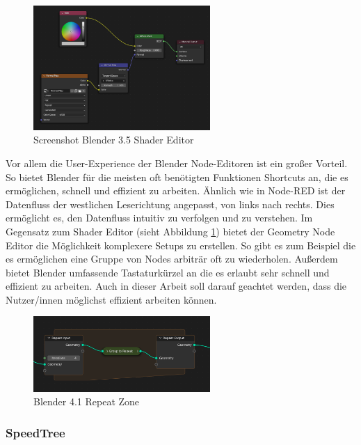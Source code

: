 \documentclass[ngerman]{article}
\begin{document}
\begin{figure}[htbp]
  \centering
  \includegraphics[width=0.6\textwidth]{./graphics/blender-shader.png}
  \caption{Screenshot Blender 3.5 Shader Editor}
  \label{fig:blender-shader}
\end{figure}

Vor allem die User-Experience der Blender Node-Editoren ist ein großer Vorteil. So bietet Blender für die meisten oft benötigten Funktionen Shortcuts an, die es ermöglichen, schnell und effizient zu arbeiten.
Ähnlich wie in Node-RED ist der Datenfluss der westlichen Leserichtung angepasst, von links nach rechts. Dies ermöglicht es, den Datenfluss intuitiv zu verfolgen und zu verstehen.
\br
Im Gegensatz zum Shader Editor (sieht Abbildung \ref{fig:blender-shader}) bietet der Geometry Node Editor die Möglichkeit komplexere Setups zu erstellen. So gibt es zum Beispiel   die es ermöglichen eine Gruppe von Nodes arbiträr oft zu wiederholen.
\br
Außerdem bietet Blender umfassende Tastaturkürzel an die es erlaubt sehr schnell und effizient zu arbeiten. Auch in dieser Arbeit soll darauf geachtet werden, dass die Nutzer/innen möglichst effizient arbeiten können.

\begin{figure}[htbp]
  \centering
  \includegraphics[width=0.6\textwidth]{./graphics/modeling_geometry-nodes_repeat_zone.png}
  \caption{Blender 4.1 Repeat Zone \cite{blenderRepeatZone}}
  \label{fig:blender-repeat}
\end{figure}

\pagebreak

\subsubsection{SpeedTree}
\end{document}

